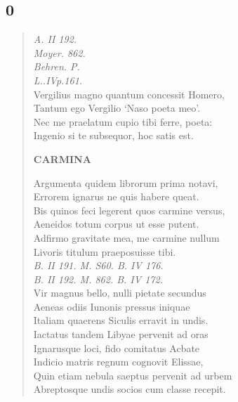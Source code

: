 \documentclass[11pt, a4paper]{report}
\begin{document}
            \subsection*{0}
      \begin{verse}
                    \textit{A. II 192.} \\ 
                    \textit{Moyer. 862.} \\ 
                    \textit{Behren. P.} \\ 
                    \textit{L..IVp.161.} \\ 
                    Vergilius magno quantum concessit Homero, \\ 
                    Tantum ego Vergilio ‘Naso poeta meo’. \\ 
                    Nec me praelatum cupio tibi ferre, poeta: \\ 
                    Ingenio si te subsequor, hoc satis est. \\ 
                    \begin{center} \textbf{CARMINA} \end{center}
                    Argumenta quidem librorum prima notavi, \\ 
                    Errorem ignarus ne quis habere queat. \\ 
                    Bis quinos feci legerent quos carmine versus, \\ 
                    Aeneidos totum corpus ut esse putent. \\ 
                    Adfirmo gravitate mea, me carmine nullum \\ 
                    Livoris titulum praeposuisse tibi. \\ 
                
                    \textit{B. II 191. M. S60. B. IV 176.} \\ 
                    \textit{B. II 192. M. 862. B. IV 172.} \\ 
                    Vir magnus bello, nulli pietate secundus \\ 
                    Aeneas odiis Iunonis pressus iniquae \\ 
                    Italiam quaerens Siculis erravit in undis. \\ 
                    Iactatus tandem Libyae pervenit ad oras \\ 
                    Ignarusque loci, fido comitatus Acbate \\ 
                    Indicio matris regnum cognovit Elissae, \\ 
                    Quin etiam nebula saeptus pervenit ad urbem \\ 
                    Abreptosque undis socios cum classe recepit. \\ 
                    

\end{verse}
\end{document}
